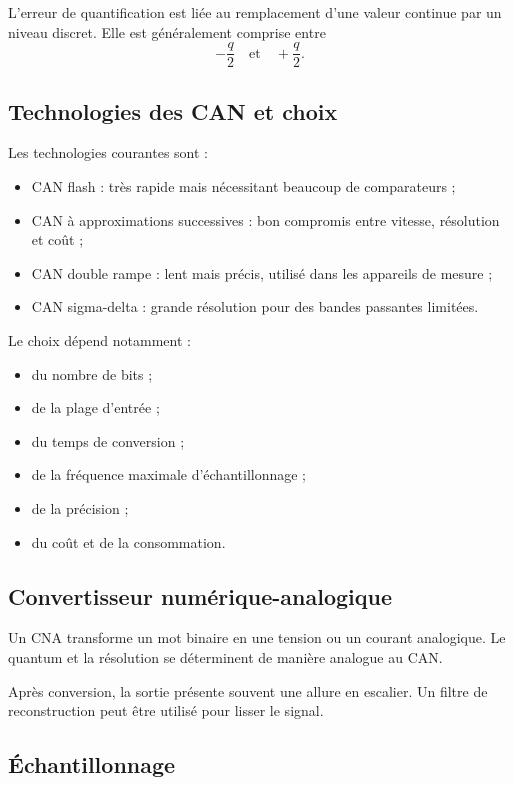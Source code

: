 L'erreur de quantification est liée au remplacement d'une valeur continue par un niveau discret. Elle est généralement comprise entre
\[
-\frac{q}{2}\quad\text{et}\quad +\frac{q}{2}.
\]

\subsection{Technologies des CAN et choix}

Les technologies courantes sont :
\begin{itemize}
  \item CAN flash : très rapide mais nécessitant beaucoup de comparateurs ;
  \item CAN à approximations successives : bon compromis entre vitesse, résolution et coût ;
  \item CAN double rampe : lent mais précis, utilisé dans les appareils de mesure ;
  \item CAN sigma-delta : grande résolution pour des bandes passantes limitées.
\end{itemize}

Le choix dépend notamment :
\begin{itemize}
  \item du nombre de bits ;
  \item de la plage d'entrée ;
  \item du temps de conversion ;
  \item de la fréquence maximale d'échantillonnage ;
  \item de la précision ;
  \item du coût et de la consommation.
\end{itemize}

\subsection{Convertisseur numérique-analogique}

Un CNA transforme un mot binaire en une tension ou un courant analogique. Le quantum et la résolution se déterminent de manière analogue au CAN.

Après conversion, la sortie présente souvent une allure en escalier. Un filtre de reconstruction peut être utilisé pour lisser le signal.

\subsection{Échantillonnage}

